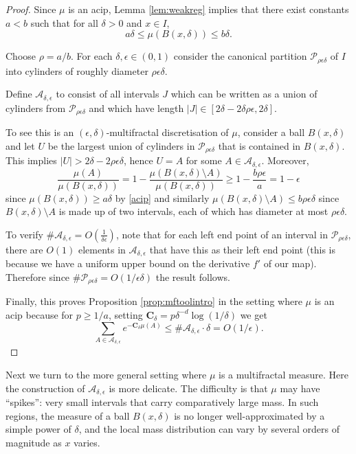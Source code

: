 \documentclass[11pt, reqno]{amsart}
\numberwithin{equation}{section}
\theoremstyle{plain}%
\theoremstyle{definition}
\def\A{\ensuremath{\mathscr A}}
\renewcommand{\A}{\mathcal{A}}
\theoremstyle{nonumberplain}
\begin{document}
\begin{proof}
Since $\mu$ is an acip, Lemma \ref{lem:weakreg} implies that there exist constants $a<b$ such that for all $\delta>0$ and $x \in I$, 
\begin{equation} \label{acip}
a\delta \leq \mu(B(x,\delta)) \leq b\delta.
\end{equation} 

Choose $\rho=a/b$. For each $\delta, \epsilon \in (0,1)$ consider the canonical partition $\mathscr{P}_{\rho\epsilon \delta}$ of $I$  into cylinders of roughly diameter $\rho\epsilon\delta$.

Define $\A_{\delta,\epsilon}$ to consist of all intervals $J$ which can be written as a union of cylinders from $\mathscr{P}_{\rho \epsilon \delta}$ and which have length $|J| \in [2\delta-2\delta \rho\epsilon, 2\delta]$. 

To see this is an $(\epsilon,\delta)$-multifractal discretisation of $\mu$, consider a ball $B(x,\delta)$ and let $U$ be the largest union of cylinders in $\mathscr{P}_{\rho \epsilon \delta}$ that is contained in $B(x,\delta)$. This implies $|U|>2\delta-2\rho \epsilon\delta$, hence $U=A$ for some $A \in \A_{\delta,\epsilon}$. Moreover,
$$\frac{\mu(A)}{\mu(B(x,\delta))}=1-\frac{\mu(B(x,\delta)\setminus A)}{\mu(B(x,\delta))} \geq 1- \frac{b\rho \epsilon}a=1-\epsilon$$
since $\mu(B(x,\delta)) \geq a\delta$ by \eqref{acip} and similarly $\mu(B(x,\delta)\setminus A) \leq b\rho \epsilon\delta$ since $B(x,\delta)\setminus A$ is made up of two intervals, each of which has diameter at most $\rho \epsilon \delta$.

To verify $\# \A_{\delta,\epsilon}=O\left(\frac{1}{\delta\epsilon}\right)$, note that for each left end point of an interval in $\mathscr{P}_{\rho \epsilon \delta}$, there are $O(1)$ elements in $\A_{\delta,\epsilon}$ that have this as their left end point (this is because we have a uniform upper bound on the derivative $f'$ of our map). Therefore since $\#\mathscr{P}_{\rho \epsilon \delta}=O(1/\epsilon\delta)$ the result follows.

Finally, this proves Proposition \ref{prop:mftoolintro} in the setting where $\mu$ is an acip because for $p\ge 1/a$, setting $\mathbf{C}_\delta=p\delta^{-d}\log(1/\delta)$ we get
$$\sum_{A \in \A_{\delta,\epsilon}} e^{-\mathbf{C}_\delta \mu(A)} \leq \#\A_{\delta,\epsilon} \cdot \delta=O(1/\epsilon).$$
\end{proof}

Next we turn to the more general setting where $\mu$ is a multifractal measure. 
Here the construction of $\A_{\delta,\epsilon}$ is more delicate. The difficulty is
that $\mu$ may have ``spikes'': very small intervals that carry comparatively
large mass. In such regions, the measure of a ball $B(x,\delta)$ is no longer
well-approximated by a simple power of $\delta$, and the local mass distribution
can vary by several orders of magnitude as $x$ varies.
\end{document}
